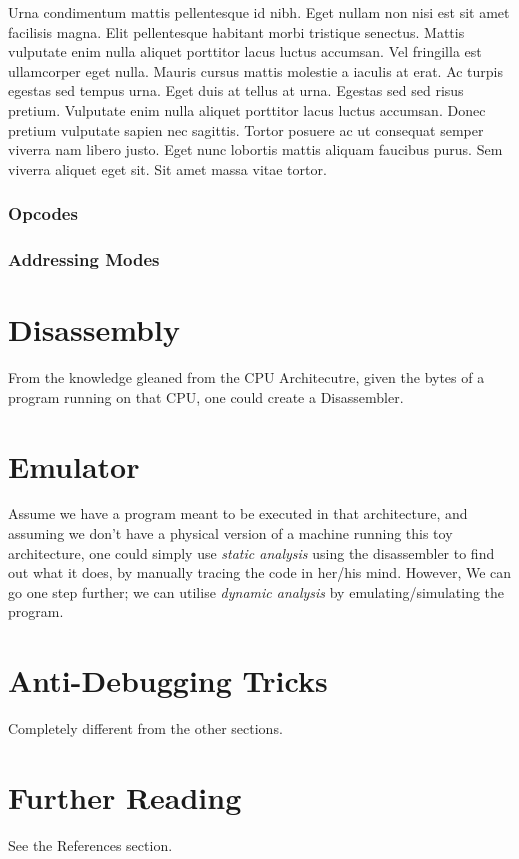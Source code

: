 \documentclass[twocolumn, a4paper,12pt]{article}
\begin{document}
Urna condimentum mattis pellentesque id nibh. Eget nullam non nisi est sit amet facilisis magna. Elit pellentesque habitant morbi tristique senectus. Mattis vulputate enim nulla aliquet porttitor lacus luctus accumsan. Vel fringilla est ullamcorper eget nulla. Mauris cursus mattis molestie a iaculis at erat. Ac turpis egestas sed tempus urna. Eget duis at tellus at urna. Egestas sed sed risus pretium. Vulputate enim nulla aliquet porttitor lacus luctus accumsan. Donec pretium vulputate sapien nec sagittis. Tortor posuere ac ut consequat semper viverra nam libero justo. Eget nunc lobortis mattis aliquam faucibus purus. Sem viverra aliquet eget sit. Sit amet massa vitae tortor.

\subsubsection{Opcodes}
\subsubsection{Addressing Modes}
\section{Disassembly}
From the knowledge gleaned from the CPU Architecutre, given the bytes of a program running
on that CPU, one could create a Disassembler.
\section{Emulator}
Assume we have a program meant to be executed in that architecture, and assuming we don't have 
a physical version of a machine running this toy architecture, one could simply use 
\textit{static analysis} using the disassembler to find out what it does, by manually tracing the code
in her/his mind.
However, We can go one step further; we can utilise \textit{dynamic analysis} by emulating/simulating 
the program.
\section{Anti-Debugging Tricks}
Completely different from the other sections.

\section{Further Reading}
See the References section.
\nocite{*}

\end{document}
